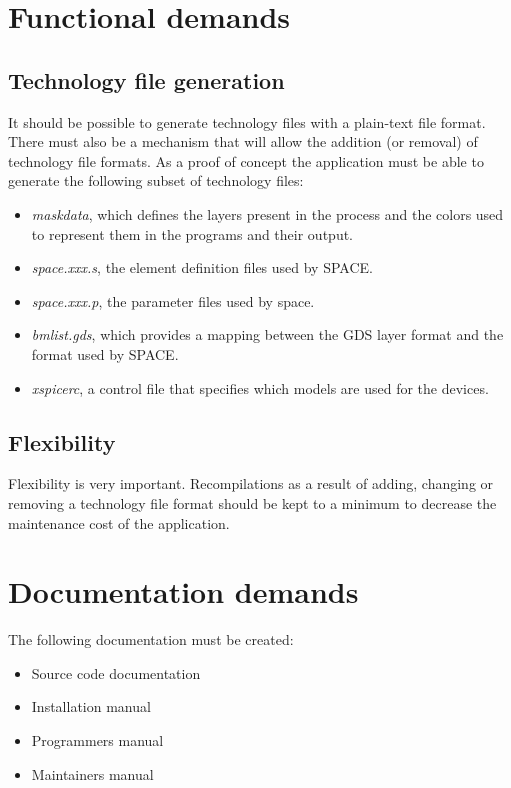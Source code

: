 \section{Functional demands}
\label{sect:demands:functional}
\subsection{Technology file generation}
It should be possible to generate technology files with a plain-text file
format. There must also be a mechanism that will allow the addition (or
removal) of technology file formats. As a proof of concept the application must
be able to generate the following subset of technology files:
\begin{itemize}
\item \emph{maskdata}, which defines the layers present in the process and the
colors used to represent them in the programs and their output.
\item \emph{space.xxx.s}, the element definition files used by SPACE.
\item \emph{space.xxx.p}, the parameter files used by space.
\item \emph{bmlist.gds}, which provides a mapping between the GDS layer format and
the format used by SPACE.
\item \emph{xspicerc}, a control file that specifies which models are used for
the devices.
\end{itemize}

\subsection{Flexibility}
Flexibility is very important. Recompilations as a result of adding, changing
or removing a technology file format should be kept to a minimum to decrease
the maintenance cost of the application.

\section{Documentation demands}
\label{sect:demands:documentation}
The following documentation must be created:
\begin{itemize}
\item Source code documentation
\item Installation manual
\item Programmers manual
\item Maintainers manual
\end{itemize}

